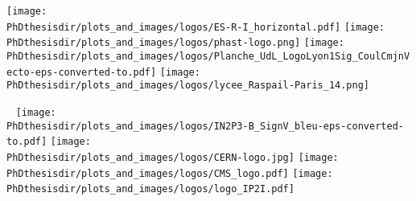 \documentclass[10pt,aspectratio=169]{beamer}
\begin{document}
%
%
%
%
%
%
%
%
%
%

\begin{frame}[noframenumbering] \thispagestyle{empty}
\vspace{-.5cm}

\texttt{[image: \\PhDthesisdir/plots\_and\_images/logos/ES-R-I\_horizontal.pdf]}
\hfill
\texttt{[image: \\PhDthesisdir/plots\_and\_images/logos/phast-logo.png]}
\hfill
\texttt{[image: \\PhDthesisdir/plots\_and\_images/logos/Planche\_UdL\_LogoLyon1Sig\_CoulCmjnVecto-eps-converted-to.pdf]}
\hfill
\texttt{[image: \\PhDthesisdir/plots\_and\_images/logos/lycee\_Raspail-Paris\_14.png]}

\vfill

\titlepage

\vfill

~ \hfill
\texttt{[image: \\PhDthesisdir/plots\_and\_images/logos/IN2P3-B\_SignV\_bleu-eps-converted-to.pdf]}
\hfill
\texttt{[image: \\PhDthesisdir/plots\_and\_images/logos/CERN-logo.jpg]}
\hfill
\texttt{[image: \\PhDthesisdir/plots\_and\_images/logos/CMS\_logo.pdf]}
\hfill
\texttt{[image: \\PhDthesisdir/plots\_and\_images/logos/logo\_IP2I.pdf]}
\hfill ~

\end{frame}
\end{document}

